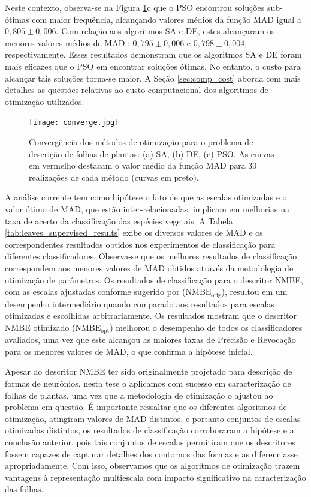 Neste contexto, observa-se na Figura \ref{fig:converge}c que o \ac{PSO} encontrou soluções sub-ótimas com maior frequência, alcançando valores médios da função \ac{MAD}  igual a $0,805 \pm 0,006$.  Com relação aos algoritmos \ac{SA} e \ac{DE}, estes alcançaram os menores valores médios de \ac{MAD} : $0,795 \pm 0,006$ e $0,798 \pm 0,004$, respectivamente. Esses resultados demonstram que os algoritmos \ac{SA} e \ac{DE} foram mais eficazes que o \ac{PSO} em encontrar soluções ótimas. No entanto, o custo para alcançar tais soluções torna-se maior. A Seção \ref{sec:comp_cost} aborda com mais detalhes as questões relativas ao custo computacional dos algoritmos de otimização utilizados.

\begin{figure}[!htb]
\caption{\label{fig:converge} Convergência dos métodos de otimização para o problema de descrição de folhas de plantas: (a) \ac{SA}, (b) \ac{DE}, (c) \ac{PSO}. As curvas em vermelho destacam o valor médio da função \ac{MAD} para $30$ realizações de cada método (curvas em preto).} 

\texttt{[image: converge.jpg]}
\end{figure}

A análise corrente tem como hipótese o fato de que as escalas otimizadas e o valor ótimo de \ac{MAD}, que estão inter-relacionadas, implicam em melhorias na taxa de acerto da classificação das espécies vegetais. A Tabela \ref{tab:leaves_supervised_results} exibe os diversos valores de \ac{MAD} e os correspondentes resultados obtidos nos experimentos de classificação para diferentes classificadores. Observa-se que os melhores resultados de classificação correspondem aos menores valores de \ac{MAD} obtidos através da metodologia de otimização de parâmetros. Os resultados de classificação para o descritor \ac{NMBE}, com as escalas ajustadas conforme sugerido por  ($\operatorname{NMBE_{orig}}$), resultou em um desempenho intermediário quando comparado aos resultados para escalas otimizadas e escolhidas arbitrariamente. Os resultados mostram que o descritor \ac{NMBE} otimizado ($\operatorname{NMBE_{opt}}$) melhorou o desempenho de todos os classificadores avaliados, uma vez que este alcançou as maiores taxas de Precisão e Revocação para os menores valores de \ac{MAD}, o que confirma a hipótese inicial.

Apesar do descritor \ac{NMBE} ter sido originalmente projetado para descrição de formas de neurônios, nesta tese o aplicamos com sucesso em caracterização de folhas de plantas, uma vez que a metodologia de otimização o ajustou ao problema em questão.
É importante ressaltar que os diferentes algoritmos de otimização, atingiram valores de \ac{MAD} distintos, e portanto conjuntos de escalas otimizadas distintos, os resultados de classificação corroboraram a hipótese e a conclusão anterior, pois tais conjuntos de escalas  permitiram que os descritores fossem capazes de capturar detalhes dos contornos das formas e as diferenciasse apropriadamente. Com isso, observamos que os algoritmos de otimização trazem vantagens à representação multiescala com impacto significativo na caracterização das folhas. 

